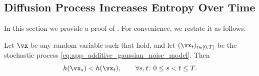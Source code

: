\documentclass[../../book-main.tex]{subfiles}
\begin{document}
\subsection{Diffusion Process Increases Entropy Over
Time}\label{sub:diffusion_entropy_increases}

In this section we provide a proof of
. For convenience, we restate
it as follows.

\begin{theorem}\label{thm:diffusion_entropy_increases}
    Let \(\vx\) be any random variable such that
    hold, and let \((\vx_{t})_{t \in [0, T]}\) be the stochastic
    process \eqref{eq:app_additive_gaussian_noise_model}. Then
    \begin{equation}\label{eq:diffusion_entropy_increases}
        h(\vx_{s}) < h(\vx_{t}), \qquad \forall s, t \colon 0 \leq s < t \leq T.
    \end{equation}
\end{theorem}
\end{document}
